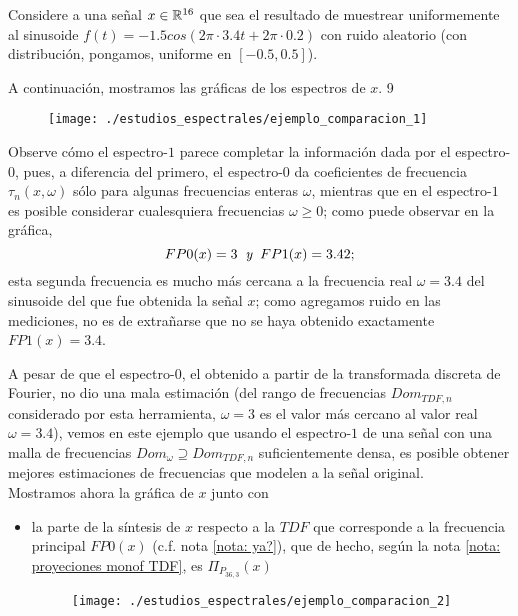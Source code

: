 \begin{ejemplo}
\label{ej: espectros comparacion}
Considere a una señal $x \in \mathbb{R}^{16}$ que sea el resultado
de muestrear uniformemente al sinusoide
$f(t) = -1.5 cos (2 \pi \cdot 3.4 t + 2 \pi \cdot 0.2)$
con ruido aleatorio (con distribución, pongamos, uniforme en $[-0.5, 0.5]$).

A continuación, mostramos las gráficas
de los espectros de $x$.
9

\begin{figure}[H]
\centering
    \texttt{[image: ./estudios\_espectrales/ejemplo\_comparacion\_1]}
\end{figure}


Observe cómo el espectro-$1$ parece completar la información
dada por el espectro-$0$, pues, a diferencia del primero,
el espectro-$0$
da coeficientes de frecuencia $\tau_{n}(x, \omega)$ sólo
para algunas frecuencias enteras $\omega$, mientras que en el espectro-$1$
es posible considerar cualesquiera frecuencias $\omega \geq 0$; como puede observar
en la gráfica, 
\[
FP0 (x) = 3 \hspace{0.2cm} \textit{y} \hspace{0.2cm}
FP1 (x) = 3.42;
\]
esta segunda frecuencia es mucho más cercana a
la frecuencia real $\omega =3.4$ del sinusoide del que
fue obtenida la señal $x$; como agregamos ruido en las mediciones, no 
es de extrañarse que no se haya
obtenido exactamente $FP1(x) = 3.4$.

A pesar de que el espectro-$0$, el obtenido a partir de la
transformada discreta de Fourier, no dio una mala estimación (del rango
de frecuencias $Dom_{TDF,n}$ considerado por esta herramienta,
$\omega =3$ es el valor más cercano al valor real $\omega = 3.4$), vemos en este
ejemplo que usando el espectro-$1$ de una señal con una malla de
frecuencias $Dom_{\omega} \supseteq Dom_{TDF,n}$
suficientemente densa, es posible obtener mejores
estimaciones de frecuencias que modelen a la señal original. \\

Mostramos ahora la gráfica de $x$ junto con
\begin{itemize}
	\item la parte de la síntesis de $x$ respecto a la $TDF$
	que corresponde a la frecuencia principal
	$FP0(x)$ (c.f.
	nota \ref{nota: ya?}), que de hecho,
	según la nota \ref{nota: proyeciones monof TDF}, es
	$\Pi_{P_{36,3}}(x)$
	\begin{figure}[H]
			\centering
			\texttt{[image: ./estudios\_espectrales/ejemplo\_comparacion\_2]} 
		\end{figure}		
	

\end{itemize}
\end{ejemplo}
